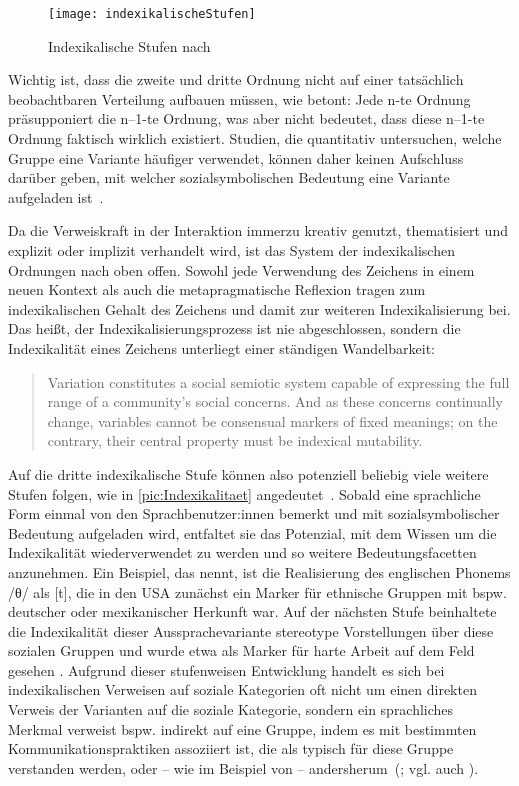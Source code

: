 \begin{figure}
\texttt{[image: indexikalischeStufen]}
\caption{Indexikalische Stufen nach \citet[]{Silverstein2003}}
\label{pic:Indexikalitaet}
\end{figure}

Wichtig ist, dass die zweite und dritte Ordnung nicht auf einer tatsächlich beobachtbaren Verteilung aufbauen müssen, wie \citet[266]{Spitzmuller2013} betont: \glqq Jede n-te Ordnung präsupponiert die n--1-te Ordnung, was aber nicht bedeutet, dass diese n--1-te Ordnung faktisch wirklich existiert\grqq. 
Studien, die quantitativ untersuchen, welche Gruppe eine Variante h{\"a}ufiger verwendet, k{\"o}nnen daher keinen Aufschluss dar{\"u}ber geben, mit welcher sozialsymbolischen Bedeutung eine Variante aufgeladen ist~\citep[s.][455]{Eckert2008}. 

Da die Verweiskraft in der Interaktion immerzu kreativ genutzt, thematisiert und explizit oder implizit verhandelt wird, ist das System der indexikalischen Ordnungen nach oben offen. 
Sowohl jede Verwendung des Zeichens in einem neuen Kontext als auch die metapragmatische Reflexion tragen zum indexikalischen Gehalt des Zeichens und damit zur weiteren Indexikalisierung bei. 
Das heißt, der Indexikalisierungsprozess ist nie abgeschlossen, sondern die Indexikalität eines Zeichens unterliegt einer ständigen Wandelbarkeit: 

\begin{quote}Variation constitutes a social semiotic system capable of expressing the full range of a community's social concerns. And as these concerns continually change, variables cannot be consensual markers of fixed meanings; on the contrary, their central property must be indexical mutability.~\citep[94]{Eckert2012}
\end{quote}
Auf die dritte indexikalische Stufe können also potenziell beliebig viele weitere Stufen folgen, wie in \autoref{pic:Indexikalitaet} angedeutet~\citep[s.][438]{Woolard2008}.
Sobald eine sprachliche Form einmal von den Sprachbenutzer:innen bemerkt und mit sozialsymbolischer Bedeutung aufgeladen wird, entfaltet sie das Potenzial, mit dem Wissen um die Indexikalität wiederverwendet zu werden und so weitere Bedeutungsfacetten anzunehmen. 
Ein Beispiel, das \citet[13--14]{Eckert.2011} nennt, ist die Realisierung des englischen Phonems \mbox{/θ/} als [t], die in den USA zunächst ein Marker für ethnische Gruppen mit bspw. deutscher oder mexikanischer Herkunft war. 
Auf der nächsten Stufe beinhaltete die Indexikalität dieser Aussprachevariante stereotype Vorstellungen über diese sozialen Gruppen und wurde etwa als Marker für harte Arbeit auf dem Feld gesehen \citep[s.][13]{Eckert.2011}. 
Aufgrund dieser stufenweisen Entwicklung handelt es sich bei indexikalischen Verweisen auf soziale Kategorien oft nicht um einen direkten Verweis der Varianten auf die soziale Kategorie, sondern ein sprachliches Merkmal verweist bspw. indirekt auf eine Gruppe, indem es mit bestimmten Kommunikationspraktiken assoziiert ist, die als typisch für diese Gruppe verstanden werden, oder -- wie im Beispiel von \citet{Eckert.2011} -- andersherum~(\citealp[s.][455]{Eckert2008}; vgl. auch \citealp{Silverstein.1985, Ochs1996}). 

